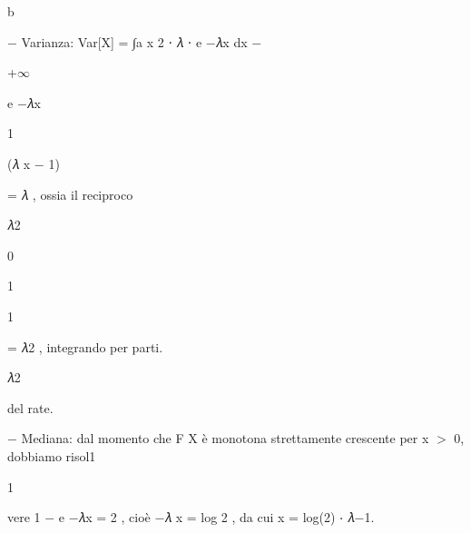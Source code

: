 \documentclass[a4paper,portrait,12pt]{article}
\begin{document}
\begin{flushleft}
b
\end{flushleft}





\begin{flushleft}
$-$ Varianza: Var[X] = ∫a x 2 ⋅ 𝜆 ⋅ e $-$𝜆x dx $-$
\end{flushleft}





+$\infty$


\begin{flushleft}
e $-$𝜆x
\end{flushleft}


1


\begin{flushleft}
(𝜆 x $-$ 1)
\end{flushleft}


\begin{flushleft}
= 𝜆 , ossia il reciproco
\end{flushleft}


\begin{flushleft}
𝜆2
\end{flushleft}


0


1


1


\begin{flushleft}
= 𝜆2 , integrando per parti.
\end{flushleft}


\begin{flushleft}
𝜆2
\end{flushleft}





\begin{flushleft}
del rate.
\end{flushleft}





\begin{flushleft}
$-$ Mediana: dal momento che F X \`{e} monotona strettamente crescente per x $>$ 0, dobbiamo risol1
\end{flushleft}


1


\begin{flushleft}
vere 1 $-$ e $-$𝜆x = 2 , cio\`{e} $-$𝜆 x = log 2 , da cui x = log(2) ⋅ 𝜆$-$1.
\end{flushleft}
\end{document}

